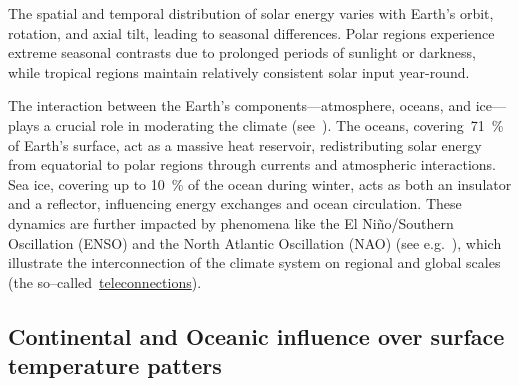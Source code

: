 The spatial and temporal distribution of solar energy varies with Earth’s orbit, rotation, and axial tilt, leading to seasonal differences.
Polar regions experience extreme seasonal contrasts due to prolonged periods of sunlight or darkness, while tropical regions
maintain relatively consistent solar input year-round.


The interaction between the Earth’s components—atmosphere, oceans, and ice—plays a crucial role in moderating the climate
(see~\secref{\ref{sec:atm-ocean-ice-interconnections}}).
The oceans, covering~\qty{71}{\percent} of Earth’s surface, act as a massive heat reservoir,
redistributing solar energy from equatorial to polar regions through currents and atmospheric interactions.
Sea ice, covering up to \qty{10}{\percent} of the ocean during winter, acts as both an insulator and a reflector,
influencing energy exchanges and ocean circulation.
These dynamics are further impacted by phenomena like the El Niño/Southern Oscillation (ENSO) and the North Atlantic Oscillation (NAO) (see e.g.~\secref{\ref{subsec:ocean-interconnections}}),
which illustrate the interconnection of the climate system on regional and global scales
(the so--called~\href{http://www.climate.gov/news-features/blogs/enso/what-are-teleconnections-connecting-earths-climate-patterns-global#:~:text=Teleconnections%20are%20significant%20relationships%20or,that%20span%20thousands%20of%20miles.}{teleconnections}).




\subsection{Continental and Oceanic influence over surface temperature patters}
\label{subsec:continentality-oceanic-effect-surface-temps}

